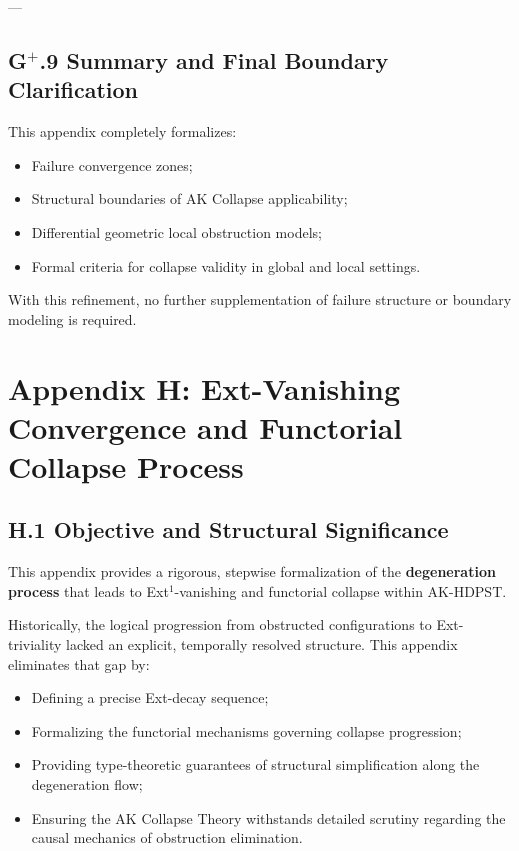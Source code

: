 \documentclass[11pt]{article}
\begin{document}
---

\subsection*{G$^{+}$.9 Summary and Final Boundary Clarification}

This appendix completely formalizes:

\begin{itemize}
    \item Failure convergence zones;
    \item Structural boundaries of AK Collapse applicability;
    \item Differential geometric local obstruction models;
    \item Formal criteria for collapse validity in global and local settings.
\end{itemize}

With this refinement, no further supplementation of failure structure or boundary modeling is required.



\section*{Appendix H: Ext-Vanishing Convergence and Functorial Collapse Process}

\subsection*{H.1 Objective and Structural Significance}

This appendix provides a rigorous, stepwise formalization of the \textbf{degeneration process} that leads to Ext$^1$-vanishing and functorial collapse within AK-HDPST.

Historically, the logical progression from obstructed configurations to Ext-triviality lacked an explicit, temporally resolved structure. This appendix eliminates that gap by:

\begin{itemize}
    \item Defining a precise Ext-decay sequence;
    \item Formalizing the functorial mechanisms governing collapse progression;
    \item Providing type-theoretic guarantees of structural simplification along the degeneration flow;
    \item Ensuring the AK Collapse Theory withstands detailed scrutiny regarding the causal mechanics of obstruction elimination.
\end{itemize}
\end{document}
